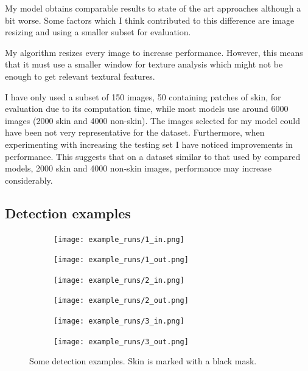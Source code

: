 \documentclass[12pt]{report}
\begin{document}
	My model obtains comparable results to state of the art approaches although a bit worse. Some factors which I think contributed to this difference are image resizing and using a smaller subset for evaluation. 
	
	My algorithm resizes every image to increase performance. However, this means that it must use a smaller window for texture analysis which might not be enough to get relevant textural features.
	
	I have only used a subset of 150 images, 50 containing patches of skin, for evaluation due to its computation time, while most models use around 6000 images (2000 skin and 4000 non-skin). The images selected for my model could have been not very representative for the dataset. Furthermore, when experimenting with increasing the testing set I have noticed improvements in performance. This suggests that on a dataset similar to that used by compared models, 2000 skin and 4000 non-skin images, performance may increase considerably.
	
	\newpage
	\subsection{Detection examples}
	\begin{figure}[h!]
		\centering
		\begin{subfigure}[b]{0.4\linewidth}
			\texttt{[image: example\_runs/1\_in.png]}
		\end{subfigure}
		\begin{subfigure}[b]{0.4\linewidth}
			\texttt{[image: example\_runs/1\_out.png]}
		\end{subfigure}
		
		
		\begin{subfigure}[b]{0.4\linewidth}
			\texttt{[image: example\_runs/2\_in.png]}
		\end{subfigure}
		\begin{subfigure}[b]{0.4\linewidth}
			\texttt{[image: example\_runs/2\_out.png]}
		\end{subfigure}
		
		\begin{subfigure}[b]{0.4\linewidth}
			\texttt{[image: example\_runs/3\_in.png]}
		\end{subfigure}
		\begin{subfigure}[b]{0.4\linewidth}
			\texttt{[image: example\_runs/3\_out.png]}
		\end{subfigure}
		
		\caption{Some detection examples. Skin is marked with a black mask.}
		\label{fig:example_detection}
	\end{figure}
	
\end{document}
